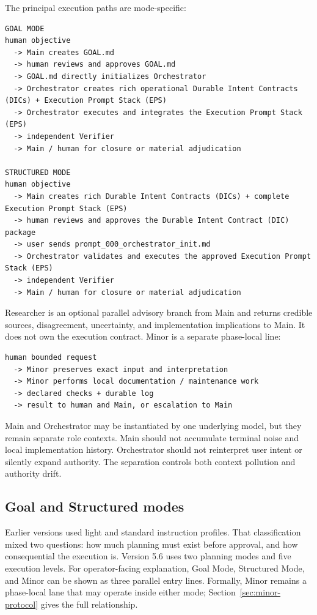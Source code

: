 \documentclass[11pt,a4paper]{article}
\begin{document}
The principal execution paths are mode-specific:

\begin{lstlisting}[style=workflow]
GOAL MODE
human objective
  -> Main creates GOAL.md
  -> human reviews and approves GOAL.md
  -> GOAL.md directly initializes Orchestrator
  -> Orchestrator creates rich operational Durable Intent Contracts (DICs) + Execution Prompt Stack (EPS)
  -> Orchestrator executes and integrates the Execution Prompt Stack (EPS)
  -> independent Verifier
  -> Main / human for closure or material adjudication

STRUCTURED MODE
human objective
  -> Main creates rich Durable Intent Contracts (DICs) + complete Execution Prompt Stack (EPS)
  -> human reviews and approves the Durable Intent Contract (DIC) package
  -> user sends prompt_000_orchestrator_init.md
  -> Orchestrator validates and executes the approved Execution Prompt Stack (EPS)
  -> independent Verifier
  -> Main / human for closure or material adjudication
\end{lstlisting}

Researcher is an optional parallel advisory branch from Main and returns credible sources,
disagreement, uncertainty, and implementation implications to Main. It does not own the execution
contract. Minor is a separate phase-local line:

\begin{lstlisting}[style=workflow]
human bounded request
  -> Minor preserves exact input and interpretation
  -> Minor performs local documentation / maintenance work
  -> declared checks + durable log
  -> result to human and Main, or escalation to Main
\end{lstlisting}

Main and Orchestrator may be instantiated by one underlying model, but they remain separate role
contexts. Main should not accumulate terminal noise and local implementation history. Orchestrator
should not reinterpret user intent or silently expand authority. The separation controls both context
pollution and authority drift.

\subsection{Goal and Structured modes}\label{sec:mode-operation}

Earlier versions used light and standard instruction profiles. That classification mixed two
questions: how much planning must exist before approval, and how consequential the execution is.
Version 5.6 uses two planning modes and five execution levels. For operator-facing explanation, Goal
Mode, Structured Mode, and Minor can be shown as three parallel entry lines. Formally, Minor remains
a phase-local lane that may operate inside either mode; Section~\ref{sec:minor-protocol} gives the
full relationship.
\end{document}
